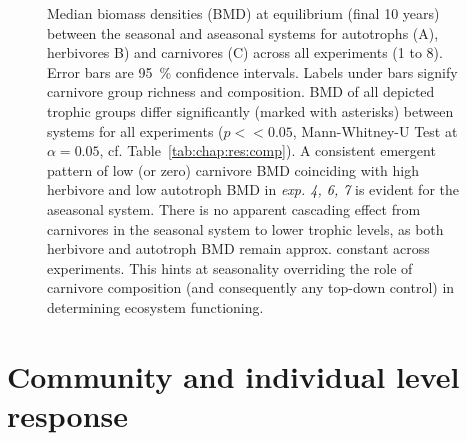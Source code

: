 \begin{figure}
\centering

\caption[Comparison median biomass density (BMD) for aseasonal and seasonal ecosystems]{Median biomass densities (BMD) at equilibrium (final 10 years) between the seasonal and aseasonal systems for autotrophs (A), herbivores B) and carnivores (C) across all experiments (1 to 8). Error bars are 95~\% confidence intervals. Labels under bars signify carnivore group richness and composition. BMD of all depicted trophic groups differ significantly (marked with asterisks) between systems for all experiments ($p << 0.05$, Mann-Whitney-U Test at $\alpha = 0.05$, cf. Table~\ref{tab:chap:res:comp}).%
 A consistent emergent pattern of low (or zero) carnivore BMD coinciding with high herbivore and low autotroph BMD in \textit{exp. 4, 6, 7} is evident for the aseasonal system.
   There is no apparent cascading effect from carnivores in the seasonal system  to lower trophic levels, as both herbivore and autotroph BMD remain approx. constant across experiments.
  This hints at seasonality overriding the role of carnivore composition (and consequently any top-down control) in determining ecosystem functioning. }
\label{fig:chap:res:dyn:comp}
\end{figure}

\clearpage



\section{Community and individual level response}
\label{chap:res:popind}
%
